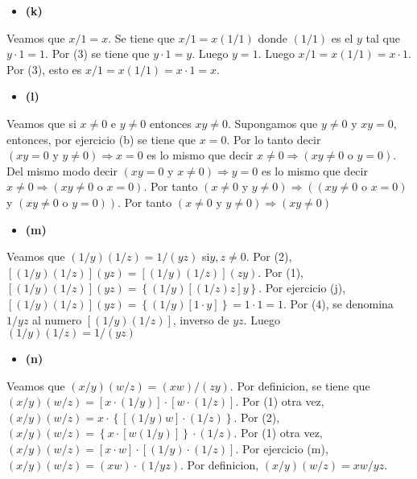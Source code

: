 \documentclass{article}
\begin{document}
\begin{itemize}
\item \bf (k) \rm 
\end{itemize}
Veamos que \(x/1=x\). Se tiene que \(x/1=x\left(1/1\right)\) donde \(\left(1/1\right)\) es el \(y\) tal que \(y\cdot 1=1\). Por (3) se tiene que \(y\cdot 1=y\). Luego \(y=1\). Luego \(x/1=x\left(1/1\right)= x\cdot 1\). Por (3), esto es \(x/1=x\left(1/1\right)= x\cdot 1=x\).
\begin{itemize}
\item \bf (l) \rm 
\end{itemize}
Veamos que si \(x\neq0\) e \(y\neq 0\) entonces \(xy\neq0\). Supongamos que \(y\neq0\) y \(xy=0\), entonces, por ejercicio (b) se tiene que \(x=0\). Por lo tanto decir \(\left(xy=0\text{ y } y\neq0\right) \Longrightarrow x=0\) es lo mismo que decir \(x\neq0 \Longrightarrow \left(xy \neq0 \text{ o } y=0\right)\). Del mismo modo
decir \(\left(xy=0\text{ y }x\neq0\right) \Longrightarrow y=0\) es lo mismo que decir \(x\neq0\Longrightarrow\left(xy\neq0\text{ o }x= 0\right)\). Por tanto \( \left( x\neq0 \text{ y }y \neq 0 \right)\Longrightarrow \left(\left(xy\neq0\text{ o }x=0\right)\right. \) y 
\(\left.\left(xy\neq0\text{ o }y=0\right)\right)\). Por tanto \( \left( x\neq 0 \text{ y }y \neq 0 \right)\Longrightarrow \left( xy \neq 0 \right)\)
\begin{itemize}
\item \bf (m) \rm 
\end{itemize}
Veamos que \(\left(1/y\right)\left(1/z\right)=1/\left(yz\right)\) si\(y,z\neq0\). Por (2), \(\left[\left(1/y\right)\left(1/z\right)\right]\left(yz\right)=\left[\left(1/y\right)\left(1/z\right)\right]\left(zy\right)\). Por (1), \(\left[\left(1/y\right)\left(1/z\right)\right]\left(yz\right)=\left\{\left(1/y\right)\left[\left(1/z\right)z\right]y\right\}\). Por ejercicio (j), \(\left[\left(1/y\right)\left(1/z\right)\right]\left(yz\right)=\left\{\left(1/y\right)\left[1\cdot y\right]\right\}=1 \cdot 1=1\). Por (4), se denomina \(1/yz\) al numero \(\left[\left(1/y\right)\left(1/z\right)\right]\), inverso de \(yz\). Luego \(\left(1/y\right)\left(1/z\right)=1/\left(yz\right)\)
\begin{itemize}
\item \bf (n) \rm 
\end{itemize}
Veamos que \(\left(x/y\right)\left(w/z\right)=\left(xw\right)/\left(zy\right)\). Por definicion, se tiene que \(\left(x/y\right)\left(w/z\right)=\left[x\cdot\left(1/y\right)\right]\cdot\left[w\cdot\left(1/z\right)\right]\). Por (1) otra vez, \(\left(x/y\right)\left(w/z\right)=x\cdot\left\{\left[\left(1/y\right)w\right]\cdot\left(1/z\right)\right\}\). Por (2), \(\left(x/y\right)\left(w/z\right)=\left\{x\cdot\left[w\left(1/y\right)\right]\right\}\cdot\left(1/z\right)\). Por (1) otra vez, \(\left(x/y\right)\left(w/z\right)=\left[x\cdot w\right]\cdot \left[\left(1/y\right)\cdot\left(1/z\right)\right]\). Por ejercicio (m),  \(\left(x/y\right)\left(w/z\right)=\left(xw\right)\cdot \left(1/yz\right)\). Por definicion, \(\left(x/y\right)\left(w/z\right)=xw/yz\).
\end{document}
